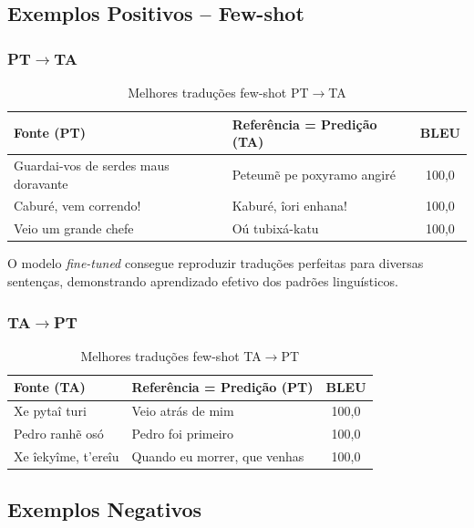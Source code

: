 \documentclass[12pt,a4paper]{article}
\begin{document}
\subsection{Exemplos Positivos -- Few-shot}

\subsubsection{PT$\rightarrow$TA}

\begin{table}[H]
\centering
\small
\begin{tabular}{p{5cm}p{5cm}c}
\toprule
\textbf{Fonte (PT)} & \textbf{Referência = Predição (TA)} & \textbf{BLEU} \\
\midrule
Guardai-vos de serdes maus doravante & Peteumẽ pe poxyramo angiré & 100,0 \\
Caburé, vem correndo! & Kaburé, îori enhana! & 100,0 \\
Veio um grande chefe & Oú tubixá-katu & 100,0 \\
\bottomrule
\end{tabular}
\caption{Melhores traduções few-shot PT$\rightarrow$TA}
\end{table}

O modelo \textit{fine-tuned} consegue reproduzir traduções perfeitas para diversas sentenças, demonstrando aprendizado efetivo dos padrões linguísticos.

\subsubsection{TA$\rightarrow$PT}

\begin{table}[H]
\centering
\small
\begin{tabular}{p{4cm}p{5cm}c}
\toprule
\textbf{Fonte (TA)} & \textbf{Referência = Predição (PT)} & \textbf{BLEU} \\
\midrule
Xe pytaî turi & Veio atrás de mim & 100,0 \\
Pedro ranhẽ osó & Pedro foi primeiro & 100,0 \\
Xe îekyîme, t'ereîu & Quando eu morrer, que venhas & 100,0 \\
\bottomrule
\end{tabular}
\caption{Melhores traduções few-shot TA$\rightarrow$PT}
\end{table}

\subsection{Exemplos Negativos}
\end{document}
